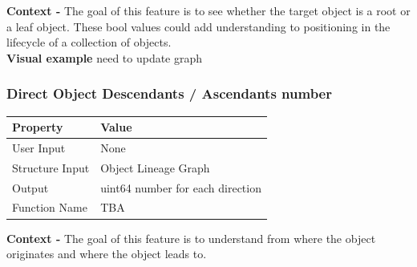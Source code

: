\documentclass{article}
\begin{document}
\textbf{Context -} The goal of this feature is to see whether the target object is a root or a leaf object. These bool values could add understanding to positioning in the lifecycle of a collection of objects.
\\

\textbf{Visual example}
need to update graph

\subsubsection{Direct Object Descendants / Ascendants number}
\begin{center}
	\begin{tabular}{| p{3cm} p{7cm} |}
		\hline
		\textbf{Property} & \textbf{Value}\\
		\hline
		User Input & None\\
		Structure Input & Object Lineage Graph\\
		Output & uint64 number for each direction\\
		Function Name & TBA\\
		\hline
	\end{tabular}
\end{center}

\textbf{Context -} The goal of this feature is to understand from where the object originates and where the object leads to.
\\
\end{document}
